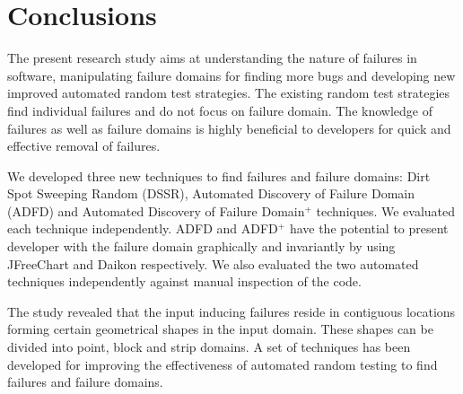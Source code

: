 
\chapter{Conclusions}
\label{chap:conclusions_8}



The present research study aims at understanding the nature of failures in software, manipulating failure domains for finding more bugs and developing new improved automated random test strategies. The existing random test strategies find individual failures and do not focus on failure domain. The knowledge of failures as well as failure domains is highly beneficial to developers for quick and effective removal of failures.


We developed three new techniques to find failures and failure domains: Dirt Spot Sweeping Random (DSSR), Automated Discovery of Failure Domain (ADFD) and Automated Discovery of Failure Domain$^+$ techniques. We evaluated each technique independently. ADFD and ADFD$^+$ have the potential to present developer with the failure domain graphically and invariantly by using JFreeChart and Daikon respectively. We also evaluated the two automated techniques independently against manual inspection of the code.

 
The study revealed that the input inducing failures reside in contiguous locations forming certain geometrical shapes in the input domain. These shapes can be divided into point, block and strip domains. A set of techniques has been developed for improving the effectiveness of automated random testing to find failures and failure domains. 


